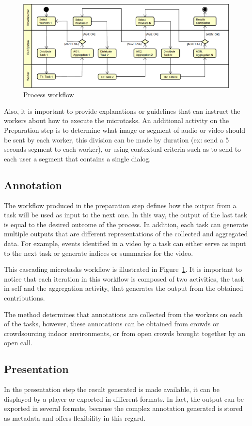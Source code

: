 \begin{figure}[h]
	\centerline{\includegraphics[scale=0.22] {figure/method}}
	\caption{Process workflow}
	\label{method}
\end{figure}


Also, it is important to provide explanations or guidelines that can instruct the workers about how to execute the microtasks. An additional activity on the Preparation step is to determine what image or segment of audio or video should be sent by each worker, this division can be made by duration (ex: send a 5 seconds segment to each worker), or using contextual criteria such as to send to each user a segment that contains a single dialog.

\subsection{Annotation}
The workflow produced in the preparation step defines how the output from a task will be used as input to the next one. In this way, the output of the last task is equal to the desired outcome of the process. In addition, each task can generate multiple outputs that are different representations of the collected and aggregated data. For example, events identified in a video by a task can either serve as input to the next task or generate indices or summaries for the video.

This cascading microtasks workflow is illustrated in Figure~\ref{method}. It is important to notice that each iteration in this workflow is composed of two activities, the task in self and the aggregation activity, that generates the output from the obtained contributions. 

The method determines that annotations are collected from the workers on each of the tasks, however, these annotations can be obtained from crowds or crowdsourcing indoor environments, or from open crowds brought together by an open call.


\subsection{Presentation} 
In the presentation step the result generated is made available, it can be displayed by a player or exported in different formats. In fact, the output can be exported in several formats, because the complex annotation generated is stored as metadata and offers flexibility in this regard.










